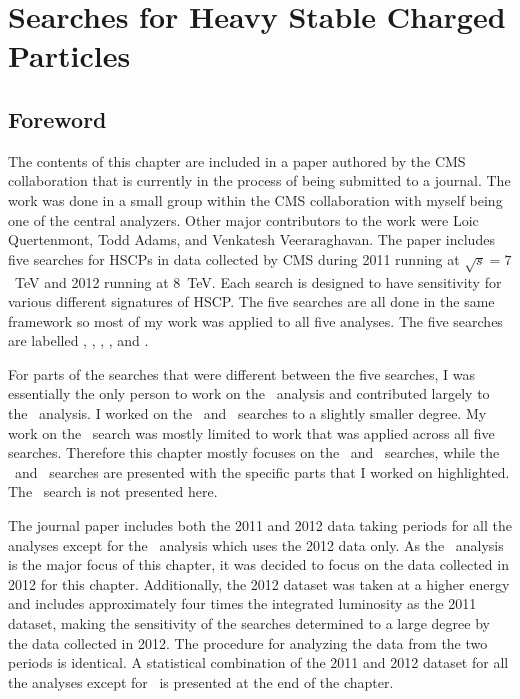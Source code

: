 \chapter{Searches for Heavy Stable Charged Particles \label{sec:search}}

\section{Foreword}
The contents of this chapter are included in a paper authored by the CMS collaboration that is currently in the process of being submitted to a journal. 
The work was done in a small group within the CMS collaboration with myself being one of the central analyzers.
Other major contributors to the work were Loic Quertenmont, Todd Adams, and Venkatesh Veeraraghavan.
The paper includes five searches for HSCPs in data collected by CMS during 2011 running at $\sqrt{s}=7$~TeV and 2012 running at 8~TeV.
Each search is designed to have sensitivity for various different signatures of HSCP. 
The five searches are all done in the same framework
so most of my work was applied to all five analyses. The five searches are labelled \muononly, \tktof, \tkonly, \multi, and \fract. 

For parts of the searches that were different between the five searches,
I was essentially the only person to work on the \muononly\ analysis and contributed largely to the \tktof\ analysis.
I worked on the \tkonly\ and \multi\ searches to a slightly smaller degree. My work on the \fract\ search was mostly limited to work that was applied across all five searches. 
Therefore this chapter mostly focuses on the \muononly\ and \tktof\ searches, while the \tkonly\ and \multi\ searches are presented
with the specific parts that I worked on highlighted. The \fract\ search is not presented here.

The journal paper includes both the 2011 and 2012 data taking periods for all the analyses except for the \muononly\ analysis which uses the 2012 data only. 
As the \muononly\ analysis is the major focus of this chapter, it was decided to focus on the data collected in 2012 for this chapter.
Additionally, the 2012 dataset was taken at a higher energy and includes approximately four times the integrated luminosity as the 2011 dataset,
making the sensitivity of the searches determined to a large degree by the data collected in 2012.
The procedure for analyzing the data from the two periods is identical.
A statistical combination of the 2011 and 2012 dataset for all the analyses except for \muononly\ is presented at the end of the chapter. 

